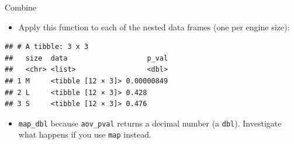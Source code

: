 \documentclass[ignorenonframetext,]{beamer}
\newenvironment{Shaded}{\begin{snugshade}}{\end{snugshade}}
\newcommand{\DataTypeTok}[1]{\textcolor[rgb]{0.13,0.29,0.53}{#1}}
\newcommand{\KeywordTok}[1]{\textcolor[rgb]{0.13,0.29,0.53}{\textbf{#1}}}
\newcommand{\NormalTok}[1]{#1}
\newcommand{\OperatorTok}[1]{\textcolor[rgb]{0.81,0.36,0.00}{\textbf{#1}}}
\newcommand{\StringTok}[1]{\textcolor[rgb]{0.31,0.60,0.02}{#1}}
\providecommand{\tightlist}{%
  \setlength{\itemsep}{0pt}\setlength{\parskip}{0pt}}
\begin{document}
\begin{frame}[fragile]{Combine}
\protect\hypertarget{combine}{}

\begin{itemize}
\tightlist
\item
  Apply this function to each of the nested data frames (one per engine
  size):
\end{itemize}

\begin{Shaded}
\end{Shaded}

\begin{verbatim}
## # A tibble: 3 x 3
##   size  data                   p_val
##   <chr> <list>                 <dbl>
## 1 M     <tibble [12 × 3]> 0.00000849
## 2 L     <tibble [12 × 3]> 0.428     
## 3 S     <tibble [12 × 3]> 0.476
\end{verbatim}

\begin{itemize}
\tightlist
\item
  \texttt{map\_dbl} because \texttt{aov\_pval} returns a decimal number
  (a \texttt{dbl}). Investigate what happens if you use \texttt{map}
  instead.
\end{itemize}

\end{frame}
\end{document}
